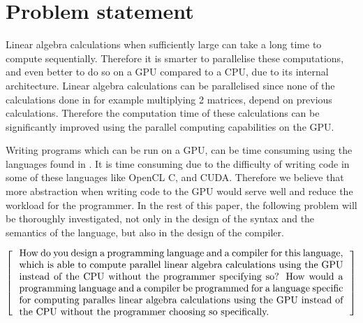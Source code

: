 \newpage
\section{Problem statement}

Linear algebra calculations when sufficiently large can take a long time to compute sequentially. 
Therefore it is smarter to parallelise these computations, and even better to do so on a GPU compared to a CPU, due to its internal architecture.
Linear algebra calculations can be parallelised since none of the calculations done in for example multiplying 2 matrices, depend on previous calculations.
Therefore the computation time of these calculations can be significantly improved using the parallel computing capabilities on the GPU.

Writing programs which can be run on a GPU, can be time consuming using the languages found in .
It is time consuming due to the difficulty of writing code in some of these languages like OpenCL C, and CUDA.
Therefore we believe that more abstraction when writing code to the GPU would serve well and reduce the workload for the programmer.
In the rest of this paper, the following problem will be thoroughly investigated, not only in the design of the syntax and the semantics of the language, but also in the design of the compiler.

\[
  \left[
  \begin{minipage}{\textwidth}
  \centering
  \begin{minipage}{0.96\textwidth}
  How do you design a programming language and a compiler for this language, which is able to compute parallel linear algebra calculations using the GPU instead of the CPU without the programmer specifying so?
  How would a programming language and a compiler be programmed for a language specific for computing paralles linear algebra calculations using the GPU instead of the CPU without the programmer choosing so specifically.  


  \end{minipage}
  \end{minipage}
    \right]
\]